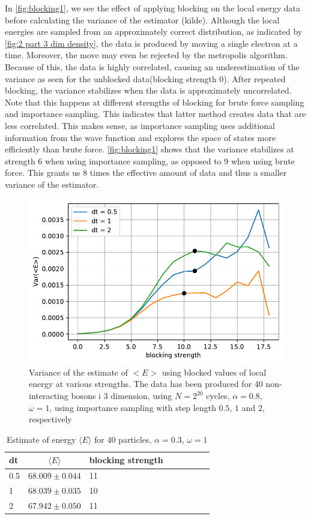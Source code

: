 In \autoref{fig:blocking1}, we see the effect of applying blocking on the local energy data before calculating the variance of the estimator (kilde). Although the local energies are sampled from an approximately correct distribution, as indicated by \autoref{fig:2 part 3 dim density}, the data is produced by moving a single electron at a time. Moreover, the move may even be rejected by the metropolis algorithm. Because of this, the data is highly correlated, causing an underestimation of the variance as seen for the unblocked data(blocking strength $0$). After repeated blocking, the variance stabilizes when the data is approximately uncorrelated. Note that this happens at different strengths of blocking for brute force sampling and importance sampling. This indicates that latter method creates data that are less correlated. This makes sense, as importance sampling uses additional information from the wave function and explores the space of states more efficiently than brute force. \autoref{fig:blocking1} shows that the variance stabilizes at strength $6$ when using importance sampling, as opposed to $9$ when using brute force. This grants us 8 times the effective amount of data and thus a smaller variance of the estimator.

\begin{figure}
	\centering
	\includegraphics[width=.8\linewidth]{figures/blocking3.pdf}
	\caption{Variance of the estimate of $<E>$ using blocked values of local energy at various strengths. The data has been produced for 40 non-interacting bosons i 3 dimension, using $N = 2^{20}$ cycles, $\alpha = 0.8$, $\omega = 1$, using importance sampling with step length $0.5$, $1$ and $2$, respectively}
	\label{fig:blocking2}
\end{figure}

\begin{table}[t]
	\begin{tabular}{lclclclc}
		\hline
		\hline
      dt & \(\langle E \rangle \)& blocking strength\\
		\hline
		0.5 & \(68.009 \pm 0.044\) & 11\\
		1 & \(68.039 \pm 0.035\) & 10\\
		2 & \(67.942 \pm 0.050\) & 11\\
		\hline
	\end{tabular}
	\caption{Estimate of energy $\langle E \rangle$ for 40 particles, $\alpha = 0.3$, $\omega = 1$}
	\label{tab:blocking}
\end{table}

